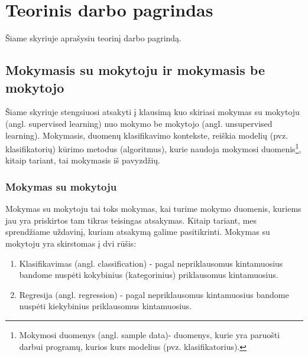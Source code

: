 \section{Teorinis darbo pagrindas}

Šiame skyriuje aprašysiu teorinį darbo pagrindą.

\subsection{Mokymasis su mokytoju ir mokymasis be mokytojo}

Šiame skyriuje stengsiuosi atsakyti į klausimą kuo skiriasi mokymas su
mokytoju (angl. supervised learning) nuo mokymo be mokytojo (angl.
unsupervised learning). Mokymasis, duomenų klasifikavimo kontekste, reiškia modelių
(pvz. klasifikatorių) kūrimo metodus (algoritmus), kurie naudoja
mokymosi duomenis\footnote{Mokymosi duomenys (angl. sample data)- duomenys,
kurie yra paruošti darbui programų, kurios kurs modelius (pvz.
klasifikatorius).}, kitaip tariant, tai mokymasis iš pavyzdžių.

\subsubsection{Mokymas su mokytoju}

Mokymas su mokytoju tai toks mokymas, kai turime mokymo duomenis, kuriems jau
yra priskirtos tam tikras teisingas atsakymas. Kitaip tariant, mes sprendžiame
uždavinį, kuriam atsakymą galime pasitikrinti. Mokymas su mokytoju yra
skirstomas į dvi rūšis:
\begin{enumerate}
  \item Klasifikavimas (angl. classification) - pagal nepriklausomus
  kintamuosius bandome nuspėti kokybinius (kategorinius) priklausomus kintamuosius. 
  \item Regresija (angl. regression) - pagal nepriklausomus kintamuosius bandome
  nuspėti kiekybinius priklausomus kintamuosius.
\end{enumerate} 




